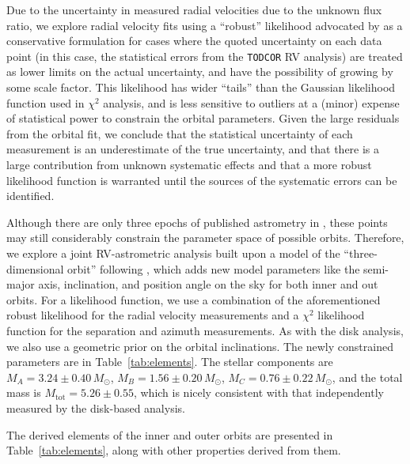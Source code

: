 \documentclass[twocolumn]{aastex61}
\begin{document}
Due to the uncertainty in measured radial velocities due to the unknown flux ratio, we explore radial velocity fits using a ``robust'' likelihood advocated by \citet[Sec. 8.3.1]{sivia06} as a conservative formulation for cases where the quoted uncertainty on each data point (in this case, the statistical errors from the \texttt{TODCOR} RV analysis) are treated as lower limits on the actual uncertainty, and have the possibility of growing by some scale factor. This likelihood has wider ``tails'' than the Gaussian likelihood function used in $\chi^2$ analysis, and is less sensitive to outliers at a (minor) expense of statistical power to constrain the orbital parameters. Given the large residuals from the orbital fit, we conclude that the statistical uncertainty of each measurement is an underestimate of the true uncertainty, and that there is a large contribution from unknown systematic effects and that a more robust likelihood function is warranted until the sources of the systematic errors can be identified.

Although there are only three epochs of published astrometry in \citet{berger11}, these points may still considerably constrain the parameter space of possible orbits. Therefore, we explore a joint RV-astrometric analysis built upon a model of the ``three-dimensional orbit'' following \citet{murray10}, which adds new model parameters like the semi-major axis, inclination, and position angle on the sky for both inner and out orbits. For a likelihood function, we use a combination of the aforementioned robust likelihood for the radial velocity measurements and a $\chi^2$ likelihood function for the separation and azimuth measurements.
As with the disk analysis, we also use a geometric prior on the orbital inclinations.
The newly constrained parameters are in Table~\ref{tab:elements}. The stellar components are $M_A = 3.24 \pm 0.40\,M_\odot$, $M_B = 1.56 \pm 0.20\,M_\odot$, $M_C = 0.76\pm 0.22\,M_\odot$, and the total mass is $M_\mathrm{tot} = 5.26 \pm 0.55$, which is nicely consistent with that independently measured by the disk-based analysis.

The derived elements of the inner and outer orbits are presented in Table~\ref{tab:elements}, along with other properties derived from them.
\end{document}
